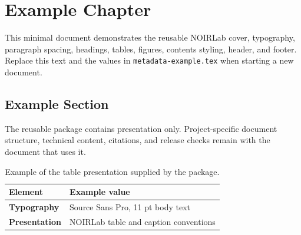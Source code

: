 \documentclass{scrreprt}
\begin{document}
\MakeNOIRLabTitlePage

\chapter{Example Chapter}

This minimal document demonstrates the reusable NOIRLab cover, typography,
paragraph spacing, headings, tables, figures, contents styling, header, and
footer. Replace this text and the values in \texttt{metadata-example.tex} when
starting a new document.

\section{Example Section}

The reusable package contains presentation only. Project-specific document
structure, technical content, citations, and release checks remain with the
document that uses it.

\begin{table}[htbp]
  \centering
  \begin{tabularx}{0.72\textwidth}{@{}>{\bfseries}p{}X@{}}
    \toprule
    Element & Example value \\
    \midrule
    Typography & Source Sans Pro, 11 pt body text \\
    Presentation & NOIRLab table and caption conventions \\
    \bottomrule
  \end{tabularx}
  \caption{Example of the table presentation supplied by the package.}
\end{table}
\end{document}
